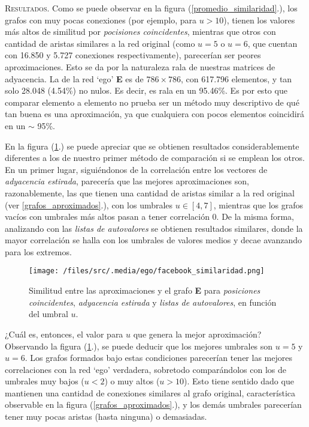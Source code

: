 \vspace{1em}
\noindent \textsc{Resultados}. Como se puede observar en la figura (\ref{promedio_similaridad}.), los grafos con muy pocas conexiones (por ejemplo, para $u > 10$), tienen los valores más altos de similitud por \textit{pocisiones coincidentes}, mientras que otros con cantidad de aristas similares a la red original (como $u = 5$ o $u = 6$, que cuentan con 16.850 y 5.727 conexiones respectivamente), parecerían ser peores aproximaciones. Esto se da por la naturaleza rala de nuestras matrices de adyacencia. La de la red `ego' \textbf{E} es de $786 \times 786$, con 617.796 elementos, y tan solo 28.048 (4.54\%) no nulos. Es decir, es rala en un 95.46\%. Es por esto que comparar elemento a elemento no prueba ser un método muy descriptivo de qué tan buena es una aproximación, ya que cualquiera con pocos elementos coincidirá en un $\sim$ 95\%.

\vspace{1em}
En la figura (\ref{grafo_correlaciones}.) se puede apreciar que se obtienen resultados considerablemente diferentes a los de nuestro primer método de comparación si se emplean los otros. En un primer lugar, siguiéndonos de la correlación entre los vectores de \textit{adyacencia estirada}, parecería que las mejores aproximaciones son, razonablemente, las que tienen una cantidad de aristas similar a la red original (ver \ref{grafos_aproximados}.), con los umbrales $u \in [4,7]$, mientras que los grafos vacíos con umbrales más altos pasan a tener correlación 0. De la misma forma, analizando con las \textit{listas de autovalores} se obtienen resultados similares, donde la mayor correlación se halla con los umbrales de valores medios y decae avanzando para los extremos.  


\begin{figure}[!htbp]
\centering
\texttt{[image: /files/src/.media/ego/facebook\_similaridad.png]}
\caption{Similitud entre las aproximaciones y el grafo \textbf{E} para \textit{posiciones coincidentes}, \textit{adyacencia estirada} y \textit{listas de autovalores}, en función del umbral $u$.}
\label{grafo_correlaciones}
\end{figure}

\vspace{1em}
¿Cuál es, entonces, el valor para $u$ que genera la mejor aproximación? 
Observando la figura (\ref{grafo_correlaciones}.), se puede deducir que los mejores umbrales son $u = 5$ y $u = 6$. Los grafos formados bajo estas condiciones parecerían tener las mejores correlaciones con la red `ego' verdadera, sobretodo comparándolos con los de umbrales muy bajos ($u < 2$) o muy altos ($u > 10$). Esto tiene sentido dado que mantienen una cantidad de conexiones similares al grafo original, característica observable en la figura (\ref{grafos_aproximados}.), y los demás umbrales parecerían tener muy pocas aristas (hasta ninguna) o demasiadas.

